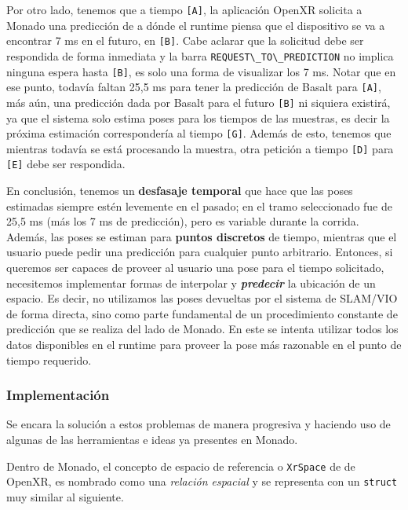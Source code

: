 \documentclass[ twoside,openright,titlepage,numbers=noenddot,%
                headinclude,footinclude,cleardoublepage=empty,abstract=on,
                BCOR=-5mm,paper=a4,fontsize=11pt
                ]{scrreprt}
\newcommand{\passthrough}[1]{#1}
\begin{document}
Por otro lado, tenemos que a tiempo \passthrough{\lstinline![A]!}, la
aplicación OpenXR solicita a Monado una predicción de a dónde el runtime
piensa que el dispositivo se va a encontrar 7 ms en el futuro, en
\passthrough{\lstinline![B]!}. Cabe aclarar que la solicitud debe ser
respondida de forma inmediata y la barra
\passthrough{\lstinline!REQUEST\_TO\_PREDICTION!} no implica ninguna
espera hasta \passthrough{\lstinline![B]!}, es solo una forma de
visualizar los 7 ms. Notar que en ese punto, todavía faltan 25,5 ms para
tener la predicción de Basalt para \passthrough{\lstinline![A]!}, más
aún, una predicción dada por Basalt para el futuro
\passthrough{\lstinline![B]!} ni siquiera existirá, ya que el sistema
solo estima poses para los tiempos de las muestras, es decir la próxima
estimación correspondería al tiempo \passthrough{\lstinline![G]!}.
Además de esto, tenemos que mientras todavía se está procesando la
muestra, otra petición a tiempo \passthrough{\lstinline![D]!} para
\passthrough{\lstinline![E]!} debe ser respondida.

En conclusión, tenemos un \textbf{desfasaje temporal} que hace que las
poses estimadas siempre estén levemente en el pasado; en el tramo
seleccionado fue de 25,5 ms (más los 7 ms de predicción), pero es
variable durante la corrida. Además, las poses se estiman para
\textbf{puntos discretos} de tiempo, mientras que el usuario puede pedir
una predicción para cualquier punto arbitrario. Entonces, si queremos
ser capaces de proveer al usuario una pose para el tiempo solicitado,
necesitemos implementar formas de interpolar y \textbf{\emph{predecir}}
la ubicación de un espacio. Es decir, no utilizamos las poses devueltas
por el sistema de SLAM/VIO de forma directa, sino como parte fundamental
de un procedimiento constante de predicción que se realiza del lado de
Monado. En este se intenta utilizar todos los datos disponibles en el
runtime para proveer la pose más razonable en el punto de tiempo
requerido.

\hypertarget{implementaciuxf3n-1}{%
\subsubsection{Implementación}\label{implementaciuxf3n-1}}

Se encara la solución a estos problemas de manera progresiva y haciendo
uso de algunas de las herramientas e ideas ya presentes en Monado.

Dentro de Monado, el concepto de espacio de referencia o
\passthrough{\lstinline!XrSpace!} de de OpenXR, es nombrado como una
\emph{relación espacial} y se representa con un
\passthrough{\lstinline!struct!} muy similar al siguiente.
\end{document}
